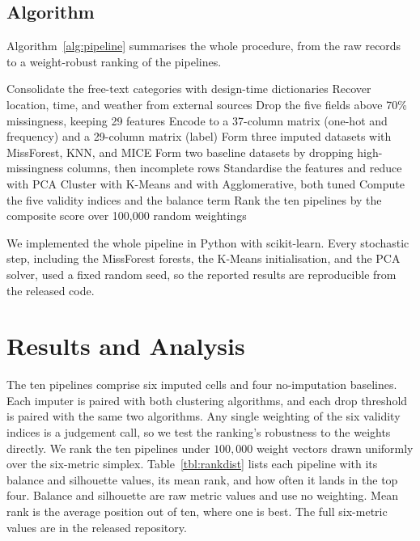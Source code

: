 \documentclass[conference]{IEEEtran}
\begin{document}
\subsection{Algorithm}
Algorithm~\ref{alg:pipeline} summarises the whole procedure, from the raw records to a weight-robust ranking of the pipelines.

\begin{algorithm}[!t]
\caption{Imputation and clustering pipeline}
\label{alg:pipeline}
\begin{algorithmic}[1]
\State Consolidate the free-text categories with design-time dictionaries
\State Recover location, time, and weather from external sources
\State Drop the five fields above 70\% missingness, keeping 29 features
\State Encode to a 37-column matrix (one-hot and frequency) and a 29-column matrix (label)
\State Form three imputed datasets with MissForest, KNN, and MICE
\State Form two baseline datasets by dropping high-missingness columns, then incomplete rows
    \State Standardise the features and reduce with PCA
    \State Cluster with K-Means and with Agglomerative, both tuned
    \State Compute the five validity indices and the balance term
\EndFor
\State Rank the ten pipelines by the composite score over 100{,}000 random weightings
\end{algorithmic}
\end{algorithm}

We implemented the whole pipeline in Python with scikit-learn. Every stochastic step, including the MissForest forests, the K-Means initialisation, and the PCA solver, used a fixed random seed, so the reported results are reproducible from the released code.

\section{Results and Analysis}
\label{sec:analysis-results}

The ten pipelines comprise six imputed cells and four no-imputation baselines. Each imputer is paired with both clustering algorithms, and each drop threshold is paired with the same two algorithms. Any single weighting of the six validity indices is a judgement call, so we test the ranking's robustness to the weights directly. We rank the ten pipelines under $100{,}000$ weight vectors drawn uniformly over the six-metric simplex. Table~\ref{tbl:rankdist} lists each pipeline with its balance and silhouette values, its mean rank, and how often it lands in the top four. Balance and silhouette are raw metric values and use no weighting. Mean rank is the average position out of ten, where one is best. The full six-metric values are in the released repository.
\end{document}

